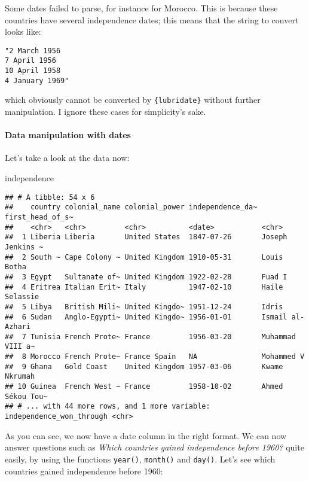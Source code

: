 \documentclass[
]{article}
\newenvironment{Shaded}{\begin{snugshade}}{\end{snugshade}}
\newcommand{\NormalTok}[1]{#1}
\begin{document}
Some dates failed to parse, for instance for Morocco. This is because these countries have several
independence dates; this means that the string to convert looks like:

\begin{verbatim}
"2 March 1956
7 April 1956
10 April 1958
4 January 1969"
\end{verbatim}

which obviously cannot be converted by \texttt{\{lubridate\}} without further manipulation. I ignore these cases for
simplicity's sake.

\hypertarget{data-manipulation-with-dates}{%
\paragraph{Data manipulation with dates}\label{data-manipulation-with-dates}}

Let's take a look at the data now:

\begin{Shaded}
\begin{Highlighting}[]
\NormalTok{independence}
\end{Highlighting}
\end{Shaded}

\begin{verbatim}
## # A tibble: 54 x 6
##    country colonial_name colonial_power independence_da~ first_head_of_s~
##    <chr>   <chr>         <chr>          <date>           <chr>           
##  1 Liberia Liberia       United States  1847-07-26       Joseph Jenkins ~
##  2 South ~ Cape Colony ~ United Kingdom 1910-05-31       Louis Botha     
##  3 Egypt   Sultanate of~ United Kingdom 1922-02-28       Fuad I          
##  4 Eritrea Italian Erit~ Italy          1947-02-10       Haile Selassie  
##  5 Libya   British Mili~ United Kingdo~ 1951-12-24       Idris           
##  6 Sudan   Anglo-Egypti~ United Kingdo~ 1956-01-01       Ismail al-Azhari
##  7 Tunisia French Prote~ France         1956-03-20       Muhammad VIII a~
##  8 Morocco French Prote~ France Spain   NA               Mohammed V      
##  9 Ghana   Gold Coast    United Kingdom 1957-03-06       Kwame Nkrumah   
## 10 Guinea  French West ~ France         1958-10-02       Ahmed Sékou Tou~
## # ... with 44 more rows, and 1 more variable: independence_won_through <chr>
\end{verbatim}

As you can see, we now have a date column in the right format. We can now answer questions such as
\emph{Which countries gained independence before 1960?} quite easily, by using the functions \texttt{year()},
\texttt{month()} and \texttt{day()}. Let's see which countries gained independence before 1960:
\end{document}
